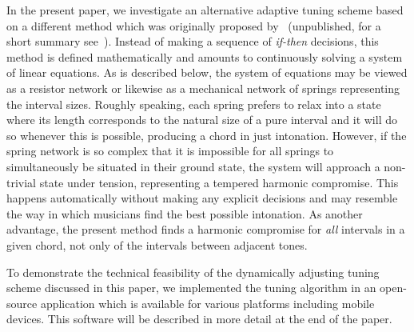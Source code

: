 In the present paper, we investigate an alternative adaptive tuning scheme based on a different method which was originally proposed by~\cite{Laubenfels} (unpublished, for a short summary see~\cite{Sethares2005}). Instead of making a sequence of \textit{if-then} decisions, this method is defined mathematically and amounts to continuously solving a system of linear equations. As is described below, the system of equations may be viewed as a resistor network or likewise as a mechanical network of springs representing the interval sizes. Roughly speaking, each spring prefers to relax into a state where its length corresponds to the natural size of a pure interval and it will do so whenever this is possible, producing a chord in just intonation. However, if the spring network is so complex that it is impossible for all springs to simultaneously be situated in their ground state, the system will approach a non-trivial state under tension, representing a tempered harmonic compromise. This happens automatically without making any explicit decisions and may resemble the way in which musicians find the best possible intonation. As another advantage, the present method finds a harmonic compromise for \textit{all} intervals in a given chord, not only of the intervals between adjacent tones. 

To demonstrate the technical feasibility of the dynamically adjusting tuning scheme discussed in this paper, we implemented the tuning algorithm in an open-source application which is available for various platforms including mobile devices. This software will be described in more detail at the end of the paper.
